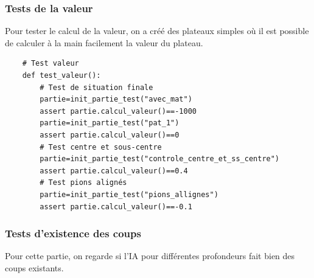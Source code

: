 \documentclass{article}
\begin{document}
\subsubsection{Tests de la valeur} 
Pour tester le calcul de la valeur, on a créé des plateaux simples où il est possible de calculer à la main facilement la valeur du plateau.

\begin{verbatim}
    # Test valeur
    def test_valeur():
        # Test de situation finale
        partie=init_partie_test("avec_mat")
        assert partie.calcul_valeur()==-1000
        partie=init_partie_test("pat_1")
        assert partie.calcul_valeur()==0
        # Test centre et sous-centre
        partie=init_partie_test("controle_centre_et_ss_centre")
        assert partie.calcul_valeur()==0.4
        # Test pions alignés
        partie=init_partie_test("pions_allignes")
        assert partie.calcul_valeur()==-0.1
\end{verbatim}
\subsubsection{Tests d'existence des coups}
Pour cette partie, on regarde si l'IA pour différentes profondeurs fait bien des coups existants.
\end{document}
